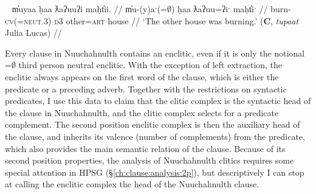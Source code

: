 \ex~ \label{ex:2padjpart}
\begingl
\glpreamble m̓uyaa ḥaa ƛaʔuuʔi maḥt̓ii. //
\gla m̓u-(y)aˑ(=$\emptyset$) ḥaa ƛaʔuu=ʔiˑ maḥt̓iˑ  //
\glb burn-\textsc{cv}(=\textsc{neut.3}) \textsc{d3} other=\textsc{art} house //
\glft `The other house was burning.' (\textbf{C}, \textit{tupaat} Julia Lucas) //
\endgl
\xe


Every clause in Nuuchahnulth contains an enclitic, even if it is only the notional =$\emptyset$ third person neutral enclitic. With the exception of left extraction, the enclitic always appears on the first word of the clause, which is either the predicate or a preceding adverb. Together with the restrictions on syntactic predicates, I use this data to claim that the clitic complex is the syntactic head of the clause in Nuuchahnulth, and the clitic complex selects for a predicate complement. The second position enclitic complex is then the auxiliary head of the clause, and inherits its valence (number of complements) from the predicate, which also provides the main semantic relation of the clause. Because of its second position properties, the analysis of Nuuchahnulth clitics requires some special attention in HPSG (\S\ref{ch:clause:analysis:2p}), but descriptively I can stop at calling the enclitic complex the head of the Nuuchahnulth clause.

